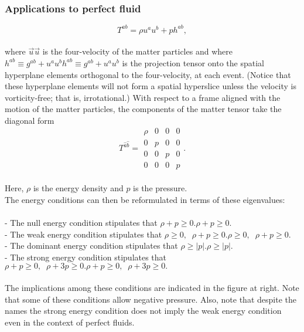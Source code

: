 \documentclass{article}
\begin{document}
\subsubsection{Applications to perfect fluid}
$$ {\displaystyle T^{ab}=\rho u^{a}u^{b}+p h^{ab},} $$
\\
where ${\displaystyle {\vec {u}}} {\vec {u}}$ is the four-velocity of the matter particles and where ${\displaystyle h^{ab}\equiv g^{ab}+u^{a}u^{b}} h^{{ab}}\equiv g^{{ab}}+u^{{a}}u^{{b}}$ is the projection tensor onto the spatial hyperplane elements orthogonal to the four-velocity, at each event. (Notice that these hyperplane elements will not form a spatial hyperslice unless the velocity is vorticity-free; that is, irrotational.) With respect to a frame aligned with the motion of the matter particles, the components of the matter tensor take the diagonal form
\\
\begin{equation}
    {\displaystyle T^{{\hat {a}}{\hat {b}}}= {\begin{matrix} \rho &0&0&0\\0&p&0&0\\0&0&p&0\\0&0&0&p \end{matrix}}.} 
\end{equation}  
\\
Here, ${\displaystyle \rho } $ is the energy density and ${\displaystyle p} $ is the pressure.
\\
The energy conditions can then be reformulated in terms of these eigenvalues:
\\
\\
- The null energy condition stipulates that ${\displaystyle \rho +p\geq 0.} {\displaystyle \rho +p\geq 0.}$\\
- The weak energy condition stipulates that ${\displaystyle \rho \geq 0,\;\;\rho +p\geq 0.} {\displaystyle \rho \geq 0,\;\;\rho +p\geq 0.}$
\\
- The dominant energy condition stipulates that ${\displaystyle \rho \geq |p|.} {\displaystyle \rho \geq |p|.}$
\\
- The strong energy condition stipulates that ${\displaystyle \rho +p\geq 0,\;\;\rho +3p\geq 0.} {\displaystyle \rho +p\geq 0,\;\;\rho +3p\geq 0.}$
\\
\\
The implications among these conditions are indicated in the figure at right. Note that some of these conditions allow negative pressure. Also, note that despite the names the strong energy condition does not imply the weak energy condition even in the context of perfect fluids.
\end{document}
